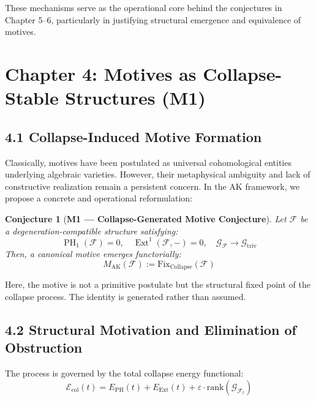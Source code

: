 \documentclass[11pt]{article}
\newtheorem{conjecture}{Conjecture}[section]
\DeclareMathOperator{\Ext}{Ext}
\DeclareMathOperator{\PH}{PH}
\begin{document}
These mechanisms serve as the operational core behind the conjectures in Chapter 5–6, particularly in justifying structural emergence and equivalence of motives.

\FloatBarrier




\section{Chapter 4: Motives as Collapse-Stable Structures (M1)}

\subsection{4.1 Collapse-Induced Motive Formation}

Classically, motives have been postulated as universal cohomological entities underlying algebraic varieties. However, their metaphysical ambiguity and lack of constructive realization remain a persistent concern. In the AK framework, we propose a concrete and operational reformulation:

\begin{conjecture}[\textbf{M1 — Collapse-Generated Motive Conjecture}]
Let $\mathcal{F}$ be a degeneration-compatible structure satisfying:
\[
\PH_1(\mathcal{F}) = 0, \quad \Ext^1(\mathcal{F}, -) = 0, \quad \mathcal{G}_{\mathcal{F}} \longrightarrow \mathcal{G}_{\mathrm{triv}}
\]
Then, a canonical motive emerges functorially:
\[
\boxed{M_{\mathrm{AK}}(\mathcal{F}) := \mathrm{Fix}_{\mathrm{Collapse}}(\mathcal{F})}
\]
\end{conjecture}


Here, the motive is not a primitive postulate but the structural fixed point of the collapse process. The identity is generated rather than assumed.

\subsection{4.2 Structural Motivation and Elimination of Obstruction}

The process is governed by the total collapse energy functional:
\[
\mathcal{E}_{\mathrm{col}}(t) = E_{\mathrm{PH}}(t) + E_{\mathrm{Ext}}(t) + \varepsilon \cdot \mathrm{rank}(\mathcal{G}_{\mathcal{F}_t})
\]
\end{document}
